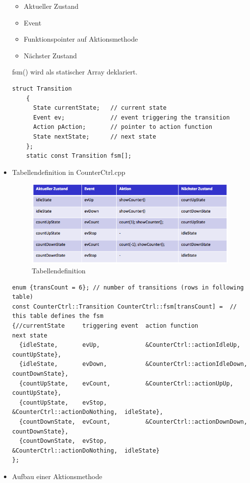\begin{itemize}
\begin{itemize}
   \item Aktueller Zustand
   \item Event
   \item Funktionspointer auf Aktionsmethode
   \item Nächster Zustand
 \end{itemize}
fsm() wird als statischer Array deklariert.
\begin{lstlisting}[style=Cpp]
struct Transition
    {
      State currentState;   // current state
      Event ev;             // event triggering the transition
      Action pAction;       // pointer to action function
      State nextState;      // next state
    };
    static const Transition fsm[];
\end{lstlisting}

\item Tabellendefinition in CounterCtrl.cpp
\begin{figure}[h]
  \centering
  {\includegraphics[scale = 0.4]{images/FSM/tabelle}  
  \caption{Tabellendefinition}
  \label{fig:tabelle}}
\end{figure}
\begin{lstlisting}[style=Cpp]
enum {transCount = 6}; // number of transitions (rows in following table)
const CounterCtrl::Transition CounterCtrl::fsm[transCount] =  // this table defines the fsm
{//currentState     triggering event  action function                 next state
  {idleState,       evUp,             &CounterCtrl::actionIdleUp,     countUpState},
  {idleState,       evDown,           &CounterCtrl::actionIdleDown,   countDownState},
  {countUpState,    evCount,          &CounterCtrl::actionUpUp,       countUpState},
  {countUpState,    evStop,           &CounterCtrl::actionDoNothing,  idleState},
  {countDownState,  evCount,          &CounterCtrl::actionDownDown,   countDownState},
  {countDownState,  evStop,           &CounterCtrl::actionDoNothing,  idleState}
};
\end{lstlisting}
\item Aufbau einer Aktionsmethode

\end{itemize}
